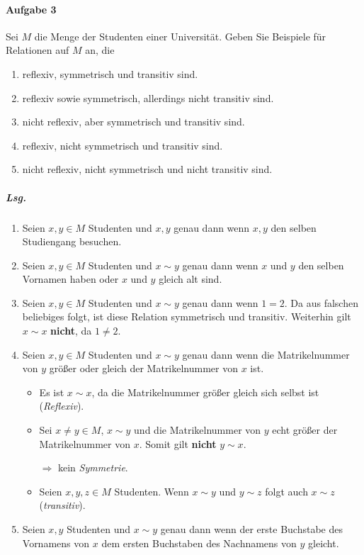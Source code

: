 \documentclass{scrreprt}
\begin{document}
\newpage
\paragraph{Aufgabe 3} Sei $M$ die Menge der Studenten einer Universität.
Geben Sie Beispiele für Relationen auf $M$ an, die
\begin{enumerate}[(1)]
\item reflexiv, symmetrisch und transitiv sind.
\item reflexiv sowie symmetrisch, allerdings nicht transitiv sind.
\item nicht reflexiv, aber symmetrisch und transitiv sind.
\item reflexiv, nicht symmetrisch und transitiv sind.
\item nicht reflexiv, nicht symmetrisch und nicht transitiv sind.
\end{enumerate}

\subparagraph{Lsg.}
\begin{enumerate}[(1)]
\item
  Seien $x, y \in M$ Studenten und $x, y$ genau dann wenn $x, y$ den selben
  Studiengang besuchen.

\item Seien $x,y \in M$ Studenten und $x \sim y$ genau dann wenn $x$ und $y$
  den selben Vornamen haben oder $x$ und $y$ gleich alt sind.

\item Seien $x,y \in M$ Studenten und $x \sim y$ genau dann wenn $1 = 2$.
  Da aus falschen beliebiges folgt, ist diese Relation symmetrisch und transitiv.
  Weiterhin gilt $x \sim x$ \textbf{nicht}, da $1 \ne 2$.

\item Seien $x,y \in M$ Studenten und $x \sim y$ genau dann wenn die
  Matrikelnummer von $y$ größer oder gleich der Matrikelnummer von $x$ ist.
  \begin{itemize}
  \item Es ist $x \sim x$, da die Matrikelnummer größer gleich sich selbst ist
    (\emph{Reflexiv}).
  \item Sei $x \ne y \in M$, $x \sim y$ und die Matrikelnummer von $y$ echt
    größer der Matrikelnummer von $x$.
    Somit gilt \textbf{nicht} $y \sim x$.

    $\Rightarrow$ kein \emph{Symmetrie}.
  \item Seien $x, y, z \in M$ Studenten.
    Wenn $x \sim y$ und $y \sim z$ folgt auch $x \sim z$ (\emph{transitiv}).
  \end{itemize}

\item Seien $x, y$ Studenten und $x \sim y$ genau dann wenn der erste Buchstabe
  des Vornamens von $x$ dem ersten Buchstaben des Nachnamens von $y$ gleicht.
\end{enumerate}
\end{document}
